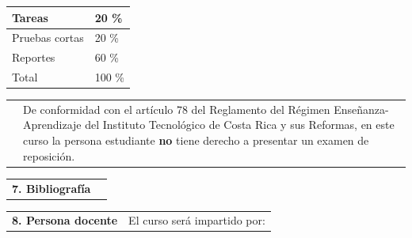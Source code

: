 \documentclass[letterpaper]{article}%
\begin{document}
\vspace*{2mm}%
\newline%
 \begin{minipage}{\linewidth}  \centering  \begin{tabular}{ p{4cm}  p{1.5cm} }  \toprule  Tareas & 20 \% \\  \midrule  Pruebas cortas & 20 \% \\  \midrule  Reportes & 60 \% \\  \midrule Total & 100 \% \\  \bottomrule  \end{tabular} \end{minipage}%
\vspace*{2mm}%
\newline%
\begin{tabularx}{\textwidth}{p{3cm}p{13cm}}%
&De conformidad con el artículo 78 del Reglamento del Régimen Enseñanza-Aprendizaje del Instituto Tecnológico de Costa Rica y sus Reformas, en este curso la persona estudiante \textbf{no} tiene derecho a presentar un examen de reposición.\\%
\end{tabularx}%
\vspace*{4mm}%
\newline%
\begin{tabularx}{\textwidth}{p{3cm}p{13cm}}%
\par\fontsize{12}{14}\selectfont \textbf{\textcolor{parte}{7. Bibliografía}}&\nocite{ida2020sensors} \nocite{fraden2016sensors} \nocite{pallas2012sensors} \\%
\end{tabularx}%
\vspace*{-8mm}\printbibliography[heading=none]%
\begin{tabularx}{\textwidth}{p{3cm}p{13cm}}%
\par\fontsize{12}{14}\selectfont \textbf{\textcolor{parte}{8. Persona docente}}&El curso será impartido por:\\%
\end{tabularx}%
\end{document}
